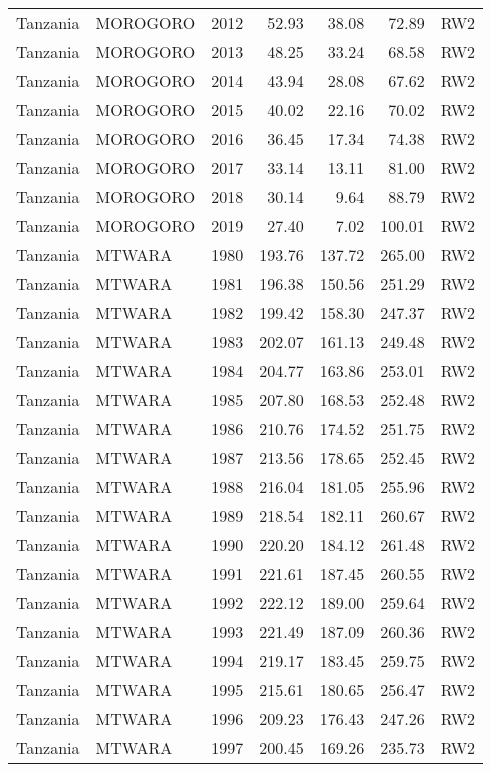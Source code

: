 \begin{longtable}{lllrrrl}
  Tanzania & MOROGORO & 2012 & 52.93 & 38.08 & 72.89 & RW2 \\ 
  Tanzania & MOROGORO & 2013 & 48.25 & 33.24 & 68.58 & RW2 \\ 
  Tanzania & MOROGORO & 2014 & 43.94 & 28.08 & 67.62 & RW2 \\ 
  Tanzania & MOROGORO & 2015 & 40.02 & 22.16 & 70.02 & RW2 \\ 
  Tanzania & MOROGORO & 2016 & 36.45 & 17.34 & 74.38 & RW2 \\ 
  Tanzania & MOROGORO & 2017 & 33.14 & 13.11 & 81.00 & RW2 \\ 
  Tanzania & MOROGORO & 2018 & 30.14 & 9.64 & 88.79 & RW2 \\ 
  Tanzania & MOROGORO & 2019 & 27.40 & 7.02 & 100.01 & RW2 \\ 
  Tanzania & MTWARA & 1980 & 193.76 & 137.72 & 265.00 & RW2 \\ 
  Tanzania & MTWARA & 1981 & 196.38 & 150.56 & 251.29 & RW2 \\ 
  Tanzania & MTWARA & 1982 & 199.42 & 158.30 & 247.37 & RW2 \\ 
  Tanzania & MTWARA & 1983 & 202.07 & 161.13 & 249.48 & RW2 \\ 
  Tanzania & MTWARA & 1984 & 204.77 & 163.86 & 253.01 & RW2 \\ 
  Tanzania & MTWARA & 1985 & 207.80 & 168.53 & 252.48 & RW2 \\ 
  Tanzania & MTWARA & 1986 & 210.76 & 174.52 & 251.75 & RW2 \\ 
  Tanzania & MTWARA & 1987 & 213.56 & 178.65 & 252.45 & RW2 \\ 
  Tanzania & MTWARA & 1988 & 216.04 & 181.05 & 255.96 & RW2 \\ 
  Tanzania & MTWARA & 1989 & 218.54 & 182.11 & 260.67 & RW2 \\ 
  Tanzania & MTWARA & 1990 & 220.20 & 184.12 & 261.48 & RW2 \\ 
  Tanzania & MTWARA & 1991 & 221.61 & 187.45 & 260.55 & RW2 \\ 
  Tanzania & MTWARA & 1992 & 222.12 & 189.00 & 259.64 & RW2 \\ 
  Tanzania & MTWARA & 1993 & 221.49 & 187.09 & 260.36 & RW2 \\ 
  Tanzania & MTWARA & 1994 & 219.17 & 183.45 & 259.75 & RW2 \\ 
  Tanzania & MTWARA & 1995 & 215.61 & 180.65 & 256.47 & RW2 \\ 
  Tanzania & MTWARA & 1996 & 209.23 & 176.43 & 247.26 & RW2 \\ 
  Tanzania & MTWARA & 1997 & 200.45 & 169.26 & 235.73 & RW2 \\ 

\end{longtable}
